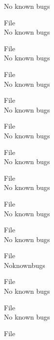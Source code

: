 \begin{DoxyRefList}
\label{bug__bug000035}%
%
No known bugs  
\item[File \doxylink{EqnEquinox_8h}{Eqn\+Equinox.h} ]\hfill \\
\label{bug__bug000006}%
%
No known bugs  
\item[File \doxylink{Frac_8cpp}{Frac.cpp} ]\hfill \\
\label{bug__bug000036}%
%
No known bugs  
\item[File \doxylink{Frac_8h}{Frac.h} ]\hfill \\
\label{bug__bug000007}%
%
No known bugs  
\item[File \doxylink{GLOBAL_8cpp}{GLOBAL.cpp} ]\hfill \\
\label{bug__bug000037}%
%
No known bugs  
\item[File \doxylink{GLOBAL_8h}{GLOBAL.h} ]\hfill \\
\label{bug__bug000008}%
%
No known bugs  
\item[File \doxylink{gmst_8cpp}{gmst.cpp} ]\hfill \\
\label{bug__bug000038}%
%
No known bugs  
\item[File \doxylink{gmst_8h}{gmst.h} ]\hfill \\
\label{bug__bug000009}%
%
No known bugs  
\item[File \doxylink{IERS_8cpp}{IERS.cpp} ]\hfill \\
\label{bug__bug000039}%
%
No known bugs  
\item[File \doxylink{IERS_8h}{IERS.h} ]\hfill \\
\label{bug__bug000010}%
%
No known bugs  
\item[File \doxylink{JPL__Eph__DE430_8cpp}{JPL\+\_\+\+Eph\+\_\+\+DE430.cpp} ]\hfill \\
\label{bug__bug000040}%
%
Noknownbugs  
\item[File \doxylink{JPL__Eph__DE430_8h}{JPL\+\_\+\+Eph\+\_\+\+DE430.h} ]\hfill \\
\label{bug__bug000011}%
%
No known bugs  
\item[File \doxylink{Legendre_8cpp}{Legendre.cpp} ]\hfill \\
\label{bug__bug000041}%
%
No known bugs  
\item[File \doxylink{Legendre_8h}{Legendre.h} ]\hfill \\

\end{DoxyRefList}
